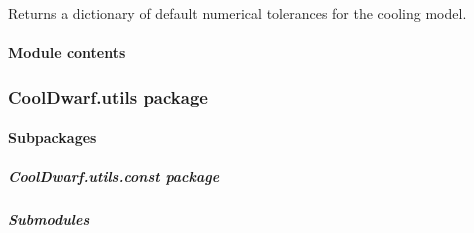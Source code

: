 \documentclass[letterpaper,10pt,english]{sphinxmanual}
\begin{document}
\begin{fulllineitems}
\label{\detokenize{CoolDwarf.star:CoolDwarf.star.sphere.default_tol}}
\pysigstartsignatures
{}
\pysigstopsignatures
\sphinxAtStartPar
Returns a dictionary of default numerical tolerances for the cooling model.
\begin{quote}\begin{description}
\begin{description}
\end{description}

\end{description}\end{quote}

\end{fulllineitems}



\paragraph{Module contents}
\label{\detokenize{CoolDwarf.star:module-CoolDwarf.star}}\label{\detokenize{CoolDwarf.star:module-contents}}
\sphinxstepscope


\subsubsection{CoolDwarf.utils package}
\label{\detokenize{CoolDwarf.utils:cooldwarf-utils-package}}\label{\detokenize{CoolDwarf.utils::doc}}

\paragraph{Subpackages}
\label{\detokenize{CoolDwarf.utils:subpackages}}
\sphinxstepscope


\subparagraph{CoolDwarf.utils.const package}
\label{\detokenize{CoolDwarf.utils.const:cooldwarf-utils-const-package}}\label{\detokenize{CoolDwarf.utils.const::doc}}

\subparagraph{Submodules}
\label{\detokenize{CoolDwarf.utils.const:submodules}}
\end{document}
